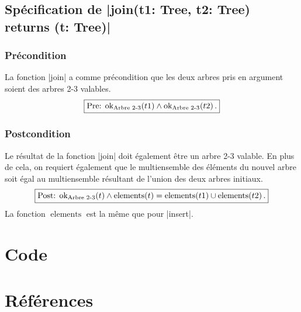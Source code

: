\documentclass{elsarticle}
\newcommand{\ok}{\ensuremath{\textnormal{ok}_{\textnormal{Arbre 2-3}}}}
\DeclareMathOperator{\elements}{elements}
\begin{document}
\subsection{Spécification de \inlinedafny|join(t1: Tree, t2: Tree) returns (t: Tree)|}
\subsubsection{Précondition}
La fonction \inlinedafny|join| a comme précondition que les deux arbres pris en argument soient des arbres 2-3 valables.
\begin{equation}
\boxed{\textnormal{Pre: } \ok(t1) \land \ok(t2)\,.}
\end{equation}

\subsubsection{Postcondition}
Le résultat de la fonction \inlinedafny|join| doit également être un arbre 2-3 valable.
En plus de cela, on requiert également que le multiensemble des éléments du nouvel arbre soit égal au multiensemble résultant de l'union des deux arbres initiaux.
\begin{equation}
\boxed{\textnormal{Post: } \ok(t) \land \elements(t) = \elements(t1) \cup \elements(t2)\,.}
\end{equation}
La fonction \(\elements\) est la même que pour \inlinedafny|insert|.

\section{Code}


\section*{Références}


\end{document}
